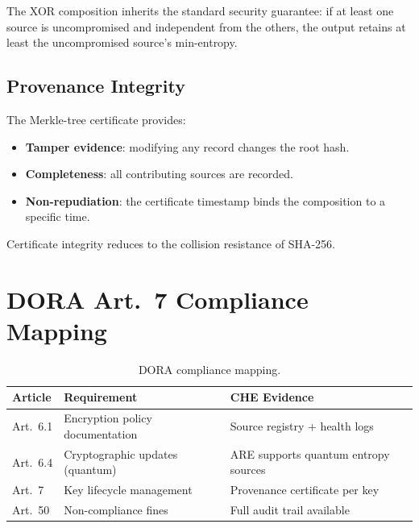 \documentclass[sigconf,anonymous,review]{acmart}
\theoremstyle{acmdefinition}%
\theoremstyle{acmplain}%
\newcommand{\che}{\textsc{CHE}\xspace}
\begin{document}
The XOR composition inherits the standard security guarantee: if at
least one source is uncompromised and independent from the others, the
output retains at least the uncompromised source's min-entropy.

\subsection{Provenance Integrity}
\label{sec:security:provenance}

The Merkle-tree certificate provides:
\begin{itemize}
  \item \textbf{Tamper evidence}: modifying any record changes the
        root hash.
  \item \textbf{Completeness}: all contributing sources are recorded.
  \item \textbf{Non-repudiation}: the certificate timestamp binds
        the composition to a specific time.
\end{itemize}

Certificate integrity reduces to the collision resistance of SHA-256.


\section{DORA Art.~7 Compliance Mapping}
\label{sec:dora}

\begin{table}[t]
  \centering
  \caption{DORA compliance mapping.}
  \label{tab:dora}
  \begin{tabular}{@{}lp{2.2cm}p{3cm}@{}}
    \toprule
    Article & Requirement & \che Evidence \\
    \midrule
    Art.~6.1 & Encryption policy documentation
             & Source registry + health logs \\
    Art.~6.4 & Cryptographic updates (quantum)
             & ARE supports quantum entropy sources \\
    Art.~7   & Key lifecycle management
             & Provenance certificate per key \\
    Art.~50  & Non-compliance fines
             & Full audit trail available \\
    \bottomrule
  \end{tabular}
\end{table}
\end{document}
